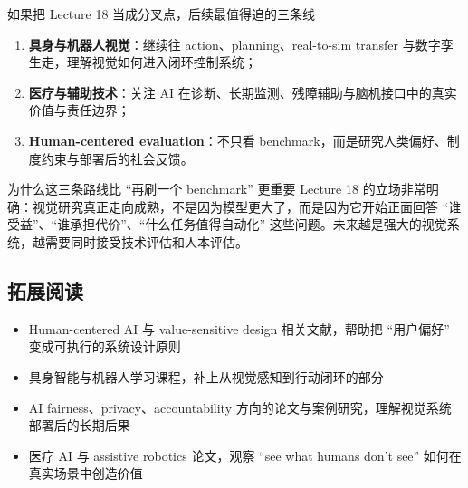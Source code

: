 \begin{importantbox}{如果把 Lecture 18 当成分叉点，后续最值得追的三条线}
\begin{enumerate}
    \item \textbf{具身与机器人视觉}：继续往 action、planning、real-to-sim transfer 与数字孪生走，理解视觉如何进入闭环控制系统；
    \item \textbf{医疗与辅助技术}：关注 AI 在诊断、长期监测、残障辅助与脑机接口中的真实价值与责任边界；
    \item \textbf{Human-centered evaluation}：不只看 benchmark，而是研究人类偏好、制度约束与部署后的社会反馈。
\end{enumerate}
\end{importantbox}

\begin{knowledgebox}{为什么这三条路线比 ``再刷一个 benchmark'' 更重要}
Lecture 18 的立场非常明确：视觉研究真正走向成熟，不是因为模型更大了，而是因为它开始正面回答 ``谁受益''、``谁承担代价''、``什么任务值得自动化'' 这些问题。未来越是强大的视觉系统，越需要同时接受技术评估和人本评估。
\end{knowledgebox}

\subsection{拓展阅读}

\begin{itemize}
    \item Human-centered AI 与 value-sensitive design 相关文献，帮助把 ``用户偏好'' 变成可执行的系统设计原则
    \item 具身智能与机器人学习课程，补上从视觉感知到行动闭环的部分
    \item AI fairness、privacy、accountability 方向的论文与案例研究，理解视觉系统部署后的长期后果
    \item 医疗 AI 与 assistive robotics 论文，观察 ``see what humans don't see'' 如何在真实场景中创造价值
\end{itemize}


